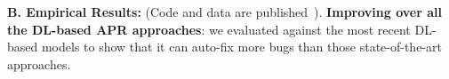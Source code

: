 {\bf B. Empirical Results:} (Code and data are published~\cite{AutoFix2019}).
{\bf Improving over all the DL-based APR approaches}: we evaluated
{\tool} against the most recent DL-based models to show that it can
auto-fix more bugs than those state-of-the-art approaches.




